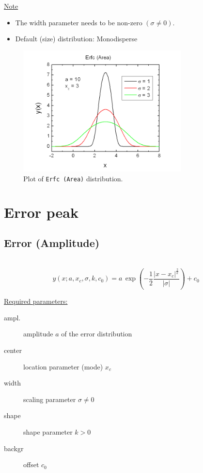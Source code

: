\underline{Note}
\begin{itemize}
  \item The width parameter needs to be non-zero $(\sigma\neq 0)$.
  \item Default (size) distribution: Monodisperse
\end{itemize}
\begin{figure}[htb]
\begin{center}
\includegraphics[width=0.768\textwidth]{ErfcArea.png}
\end{center}
\caption{Plot of \texttt{Erfc (Area)} distribution.}
\label{fig:ErfcArea}
\end{figure}

\clearpage
\section{Error peak}
\label{sec:ErrorPeak}
\subsection{Error (Amplitude)} \hspace{1pt} \\
\label{sec:ErrorPeakAmplitude}
\begin{equation}
y(x;a,x_c,\sigma,k,c_0) = a \, \exp\left(-\frac{1}{2}\frac{\left|x-x_c\right|^{\frac{2}{k}}}{\left|\sigma\right|}\right)+c_0
\end{equation}
\vspace{5mm}

\underline{Required parameters:}
\begin{description}
    \item[ampl.] amplitude $a$ of the error distribution
    \item[center] location parameter (mode) $x_c$
    \item[width] scaling parameter $\sigma\neq 0$
    \item[shape] shape parameter $k>0$
    \item[backgr] offset $c_0$
\end{description}

